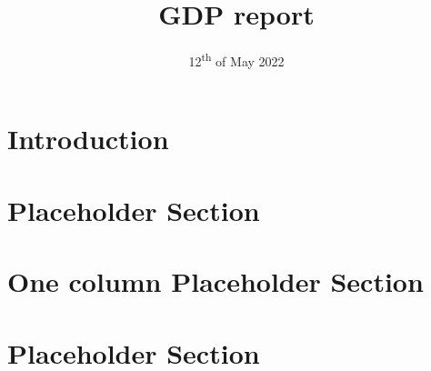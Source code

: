 \documentclass{article}
\title{GDP report}
\date{12\textsuperscript{th} of May 2022}
\begin{document}



\section{Introduction}


\section{Placeholder Section}


\onecolumn
\section{One column Placeholder Section}

\twocolumn

\section{Placeholder Section}

\end{document}
